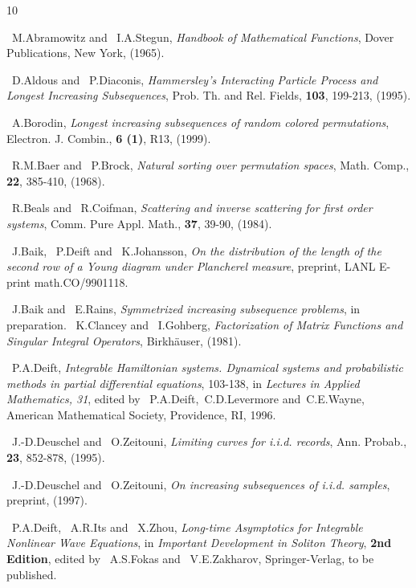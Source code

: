 \documentclass{amsart}
\theoremstyle{definition}
\theoremstyle{remark}
\numberwithin{equation}{section}
\begin{document}
\begin{thebibliography}{10}

~M.Abramowitz and ~I.A.Stegun, \emph{Handbook of Mathematical Functions}, 
Dover Publications, New York, (1965). 

~D.Aldous and ~P.Diaconis, \emph{Hammersley's Interacting Particle
Process and Longest Increasing Subsequences},
Prob. Th. and Rel. Fields, \textbf{103}, 199-213, (1995).

~A.Borodin, \emph{Longest increasing subsequences of random 
colored permutations}, Electron. J. Combin., \textbf{6 (1)}, 
R13, (1999).

~R.M.Baer and ~P.Brock, \emph{Natural sorting over permutation spaces}, 
Math. Comp., \textbf{22}, 385-410, (1968).

~R.Beals and ~R.Coifman, \emph{Scattering and inverse scattering for 
first order systems}, Comm. Pure Appl. Math., \textbf{37}, 
39-90, (1984).

~J.Baik, ~P.Deift and ~K.Johansson, 
\emph{On the distribution of the length of the second row 
of a Young diagram under Plancherel measure}, 
preprint, LANL E-print math.CO/9901118.

~J.Baik and ~E.Rains, \emph{Symmetrized increasing subsequence problems}, 
in preparation.
~K.Clancey and ~I.Gohberg, \emph{Factorization of Matrix Functions 
and Singular Integral Operators}, Birkh\"auser, (1981). 

~P.A.Deift, \emph{Integrable Hamiltonian systems. Dynamical systems 
and probabilistic methods in partial differential equations}, 103-138, 
in \emph{Lectures in Applied Mathematics, 31}, edited by 
~P.A.Deift,~C.D.Levermore and~C.E.Wayne, American 
Mathematical Society, Providence, RI, 1996.

~J.-D.Deuschel and ~O.Zeitouni, \emph{Limiting curves for i.i.d. 
records}, Ann. Probab., \textbf{23}, 852-878, (1995).

~J.-D.Deuschel and ~O.Zeitouni, \emph{On increasing subsequences of 
i.i.d. samples}, preprint, (1997).

~P.A.Deift, ~A.R.Its and ~X.Zhou, \emph{Long-time Asymptotics 
for Integrable Nonlinear Wave Equations}, 
in \emph{Important Development in Soliton Theory}, 
\textbf{2nd Edition}, edited by ~A.S.Fokas and ~V.E.Zakharov, 
Springer-Verlag, to be published.


\end{thebibliography}
\end{document}
